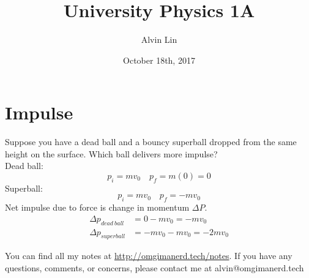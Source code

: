 \documentclass[letterpaper, 12pt]{math}
\title{University Physics 1A}
\author{Alvin Lin}
\date{October 18th, 2017}
\begin{document}
\maketitle

\section*{Impulse}
Suppose you have a dead ball and a bouncy superball dropped from the same
height on the surface. Which ball delivers more impulse? \\
Dead ball:
\[ p_i = mv_0 \quad p_f = m(0) = 0 \]
Superball:
\[ p_i = mv_0 \quad p_f = -mv_0 \]
Net impulse due to force is change in momentum \( \Delta{P} \).
\begin{align*}
  \Delta{p}_{dead~ball} &= 0-mv_0 = -mv_0 \\
  \Delta{p}_{superball} &= -mv_0-mv_0 = -2mv_0
\end{align*}

\begin{center}
  You can find all my notes at \url{http://omgimanerd.tech/notes}. If you have
  any questions, comments, or concerns, please contact me at
  alvin@omgimanerd.tech
\end{center}
\end{document}
